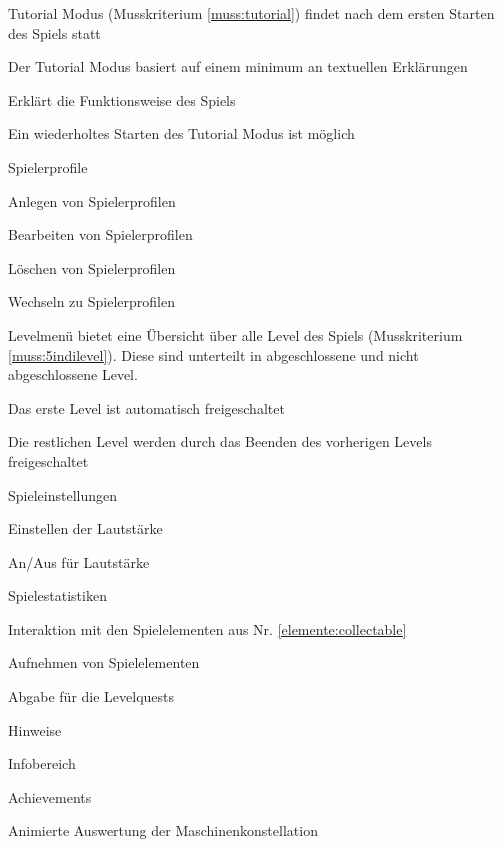 \documentclass{scrartcl}
\begin{document}
\begin{falist}
	\item Tutorial Modus (Musskriterium \ref{muss:tutorial}) findet nach dem ersten Starten des Spiels statt
	\begin{falist}
        \item Der Tutorial Modus basiert auf einem minimum an textuellen Erklärungen
        \item Erklärt die Funktionsweise des Spiels
		\item Ein wiederholtes Starten des Tutorial Modus ist möglich
	\end{falist}
	\item Spielerprofile
	\begin{falist}
		\item Anlegen von Spielerprofilen
		\item Bearbeiten von Spielerprofilen
		\item Löschen von Spielerprofilen
		\item Wechseln zu Spielerprofilen
	\end{falist}
	\item Levelmenü bietet eine Übersicht über alle Level des Spiels (Musskriterium \ref{muss:5indilevel}). Diese sind unterteilt in abgeschlossene und nicht abgeschlossene Level.
    \begin{falist}
        \item Das erste Level ist automatisch freigeschaltet
        \item Die restlichen Level werden durch das Beenden des vorherigen Levels freigeschaltet
    \end{falist}
	\item Spieleinstellungen
	\begin{falist}
		\item Einstellen der Lautstärke
		\item An/Aus für Lautstärke
	\end{falist}
	\item Spielestatistiken
	\begin{falist}
		\item
	\end{falist}
	\item Interaktion mit den Spielelementen aus Nr. \ref{elemente:collectable}
	\begin{falist}
		\item Aufnehmen von Spielelementen
		\item Abgabe für die Levelquests
	\end{falist}
	\item Hinweise
	\item Infobereich
    \item Achievements
    \item Animierte Auswertung der Maschinenkonstellation
\end{falist}
\end{document}
